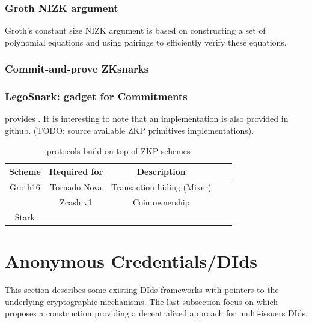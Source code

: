 \documentclass[11pt]{llncs2e/llncs}
\begin{document}
\subsubsection{Groth NIZK argument}
Groth’s constant size NIZK argument is based on constructing a set of polynomial equations and using pairings to efficiently verify these equations.

\subsubsection{Commit-and-prove ZKsnarks}

\subsubsection{LegoSnark: gadget for Commitments}

\cite{LegoSnark} provides . It is interesting to note that an implementation is also provided in github. (TODO: source available ZKP primitives implementations).
 
\begin{table}
\begin{center}
 \begin{tabular}{ |c| c|c|c|c|}
  \hline
  Scheme & Required for & Description \\
  \hline\hline
  Groth16  & Tornado Nova & Transaction hiding (Mixer)\\
           & Zcash v1& Coin ownership\\
  \hline
  Stark && \\
  \hline
  
  \hline
  
 \end{tabular}
 \end{center}
 \caption{protocols build on top of ZKP schemes}
 \label{tab-usecommit}
\end{table}
 
\section{Anonymous Credentials/DIds}

This section describes some existing DIds frameworks with pointers to the underlying cryptographic mechanisms. The last subsection focus on \cite{ElkhiyaouiCA21 } which proposes a construction providing a decentralized approach for multi-issuers DIds.
\end{document}
